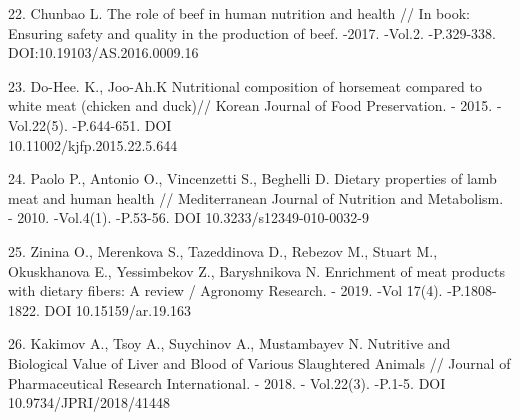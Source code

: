 \begin{references}
22. Chunbao L. The role of beef in human nutrition and health // In
book: Ensuring safety and quality in the production of beef. -2017.
-Vol.2. -P.329-338. DOI:10.19103/AS.2016.0009.16

23. Do-Hee. K., Joo-Ah.K Nutritional composition of horsemeat compared
to white meat (chicken and duck)// Korean Journal of Food Preservation.
- 2015. -Vol.22(5). -P.644-651. DOI \\10.11002/kjfp.2015.22.5.644

24. Paolo P., Antonio O., Vincenzetti S., Beghelli D. Dietary properties
of lamb meat and human health // Mediterranean Journal of Nutrition and
Metabolism. - 2010. -Vol.4(1). -P.53-56. DOI 10.3233/s12349-010-0032-9

25. Zinina O., Merenkova S., Tazeddinova D., Rebezov M., Stuart M.,
Okuskhanova E., Yessimbekov Z., Baryshnikova N. Enrichment of meat
products with dietary fibers: A review / Agronomy Research. - 2019. -Vol
17(4). -P.1808-1822. DOI 10.15159/ar.19.163

26. Kakimov A., Tsoy A., Suychinov A., Mustambayev N. Nutritive and
Biological Value of Liver and Blood of Various Slaughtered Animals //
Journal of Pharmaceutical Research International. - 2018. - Vol.22(3).
-P.1-5. DOI 10.9734/JPRI/2018/41448
\end{references}


